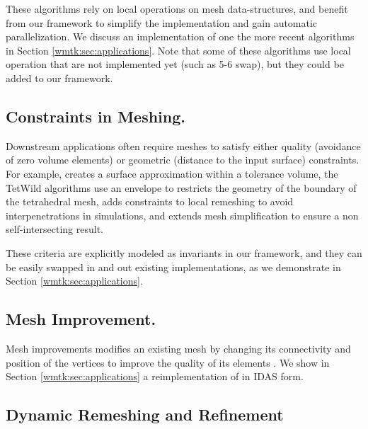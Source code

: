 These algorithms rely on local operations on mesh data-structures, and benefit from our framework to simplify the implementation and gain automatic parallelization. We discuss an implementation of one the more recent algorithms \cite{hu2018tetrahedral,Hu:2019:fTetWild} in Section \ref{wmtk:sec:applications}. Note that some of these algorithms use local operation that are not implemented yet (such as 5-6 swap), but they could be added to our framework.

\subsection{Constraints in Meshing.}

Downstream applications often require meshes to satisfy either quality (avoidance of zero volume elements) or geometric (distance to the input surface) constraints. For example, \citet{mandad2015isotopic} creates a surface approximation within a tolerance volume, the TetWild algorithms \cite{hu2018tetrahedral,Hu:2019:fTetWild} use an envelope \cite{Wang:2021} to restricts the geometry of the boundary of the tetrahedral mesh, \cite{Brochu:2012} adds constraints to local remeshing to avoid interpenetrations in simulations, and \cite{gumhold2003intersection} extends mesh simplification \cite{Garland:1999,Popovic:1997} to ensure a non self-intersecting result. 

These criteria are explicitly modeled as invariants in our framework, and they can be easily swapped in and out existing implementations, as we demonstrate in Section \ref{wmtk:sec:applications}.

\subsection{Mesh Improvement.} 

Mesh improvements modifies an existing mesh by changing its connectivity and position of the vertices to improve the quality of its elements \cite{Canann1996,CANANN1993185,Lori1998,Lipman:2012,Chen:2004:ODT,alliez2005variational,feng2018curved,hu2018tetrahedral,Alexa:2019,Klingner07aggressive}.
%
%
We show in Section \ref{wmtk:sec:applications} a reimplementation of \cite{Alexa:2019} in IDAS form.

\subsection{Dynamic Remeshing and Refinement} 

